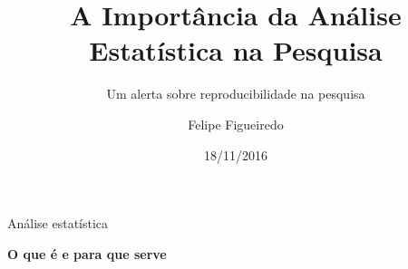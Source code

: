 \documentclass{beamer}
\title[Estatística na Pesquisa] %
{A Importância da Análise Estatística na Pesquisa}
\subtitle
{Um alerta sobre reproducibilidade na pesquisa} %
\author%
{Felipe Figueiredo}%
\institute[INTO] %
{Mestrado Profissional em Ciências Aplicadas ao Sistema Musculoesquelético\\
Instituto Nacional de Traumatologia e Ortopedia Jamil Haddad
}
\date%
{18/11/2016}
\begin{document}
\begin{frame}
  \titlepage
\end{frame}









\begin{frame}{Análise estatística}
  \begin{center}
    {\bf O que é e para que serve}
  \end{center}
\end{frame}
\end{document}
